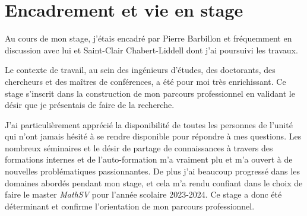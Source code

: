 \section{Encadrement et vie en stage}

Au cours de mon stage, j'étais encadré par Pierre Barbillon et fréquemment en
discussion avec lui et Saint-Clair Chabert-Liddell dont j'ai poursuivi les
travaux.

Le contexte de travail, au sein des ingénieurs d'études, des doctorants, des
chercheurs et des maîtres de conférences, a été pour moi très enrichissant. Ce
stage s'inscrit dans la construction de mon parcours professionnel en validant
le désir que je présentais de faire de la recherche.

J'ai particulièrement apprécié la disponibilité de toutes les personnes de
l'unité qui n'ont jamais hésité à se rendre disponible pour répondre à mes
questions.
Les nombreux séminaires et le désir de partage de connaissances à travers des
formations internes et de l'auto-formation m'a vraiment plu et m'a ouvert à de
nouvelles problématiques passionnantes.
De plus j'ai beaucoup progressé dans les domaines abordés pendant mon
stage, et cela m'a rendu confiant dans le choix de faire le
master \emph{MathSV} pour l'année scolaire 2023-2024. Ce stage a donc été
déterminant et confirme l'orientation de mon parcours professionnel.